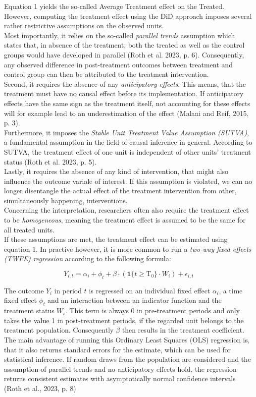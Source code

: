 \documentclass[8pt]{article}
\begin{document}
Equation 1 yields the so-called Average Treatment effect on the Treated.
However, computing the treatment effect using the DiD approach imposes several rather restrictive assumptions on the observed units. \\
Most importantly, it relies on the so-called \textit{parallel trends} assumption which states that, in absence of the treatment, both the treated as well as the control groups would have developed in parallel (Roth et al. 2023, p. 6). Consequently, any observed difference in post-treatment outcomes between treatment and control group can then be attributed to the treatment intervention. \\
Second, it requires the absence of any \textit{anticipatory effects}. This means, that the treatment must have no causal effect before its implementation. If anticipatory effects have the same sign as the treatment itself, not accounting for these effects will for example lead to an underestimation of the effect (Malani and Reif, 2015, p. 3). \\
Furthermore, it imposes the \textit{Stable Unit Treatment Value Assumption (SUTVA)}, a fundamental assumption in the field of causal inference in general. According to SUTVA, the treatment effect of one unit is independent of other units' treatment status (Roth et al. 2023, p. 5). \\
Lastly, it requires the absence of any kind of intervention, that might also influence the outcome variale of interest. If this assumption is violated, we can no longer disentangle the actual effect of the treatment intervention from other, simultaneously happening, interventions. \\
Concerning the interpretation, researchers often also require the treatment effect to be \textit{homogeneous}, meaning the treatment effect is assumed to be the same for all treated units. \\
If these assumptions are met, the treatment effect can be estimated using equation 1. In practive however, it is more common to run a \textit{two-way fixed effects (TWFE) regression} according to the following formula:

\begin{equation}
Y_{i,t} = \alpha_i + \phi_t + \beta \cdot \left( \mathbf{1}{\{ t \geq \text{T}_0 \}} \cdot W_i \right) + \epsilon_{i,t}
\end{equation}

The outcome $Y_i$ in period $t$ is regressed on an individual fixed effect $\alpha_i$, a time fixed effect $\phi_t$ and an interaction between an indicator function and the treatment status $W_i$. This term is always 0 in pre-treatment periods and only takes the value 1 in post-treatment periods, if the regarded unit belongs to the treatment population. Consequently $\beta$ then results in the treatment coefficient. The main advantage of running this Ordinary Least Squares (OLS) regression is, that it also returns standard errors for the estimate, which can be used for statistical inference. If random draws from the population are considered and the assumption of parallel trends and no anticipatory effects hold, the regression returns consistent estimates with asymptotically normal confidence intervals (Roth et al., 2023, p. 8)
\end{document}
